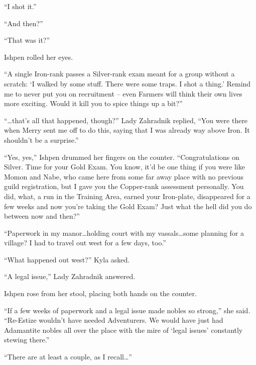 “I shot it.”

 

“And then?”

 

“That was it?”

 

Ishpen rolled her eyes.

 

“A single Iron-rank passes a Silver-rank exam meant for a group without a scratch: ‘I walked by some stuff. There were some traps. I shot a thing.’ Remind me to never put you on recruitment – even Farmers will think their own lives more exciting. Would it kill you to spice things up a bit?”

 

“…that’s all that happened, though?” Lady Zahradnik replied, “You were there when Merry sent me off to do this, saying that I was already way above Iron. It shouldn’t be a surprise.”

 

“Yes, yes,” Ishpen drummed her fingers on the counter. “Congratulations on Silver. Time for your Gold Exam. You know, it’d be one thing if you were like Momon and Nabe, who came here from some far away place with no previous guild registration, but I gave you the Copper-rank assessment personally. You did, what, a run in the Training Area, earned your Iron-plate, disappeared for a few weeks and now you’re taking the Gold Exam? Just what the hell did you do between now and then?”

 

“Paperwork in my manor…holding court with my vassals…some planning for a village? I had to travel out west for a few days, too.”

 

“What happened out west?” Kyla asked.

 

“A legal issue,” Lady Zahradnik answered.

 

Ishpen rose from her stool, placing both hands on the counter.

 

“If a few weeks of paperwork and a legal issue made nobles so strong,” she said. “Re-Estize wouldn’t have needed Adventurers. We would have just had Adamantite nobles all over the place with the mire of ‘legal issues’ constantly stewing there.”

 

“There are at least a couple, as I recall…”

